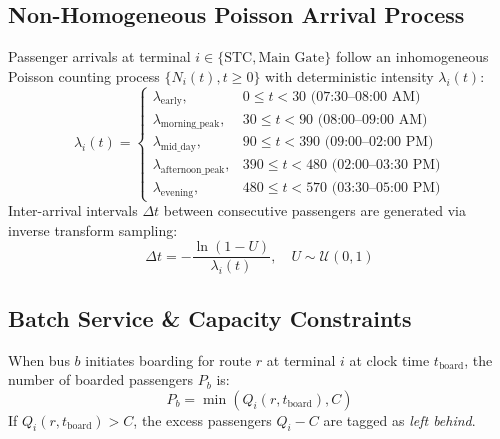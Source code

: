\documentclass[conference]{IEEEtran}
\begin{document}
\subsection{Non-Homogeneous Poisson Arrival Process}
Passenger arrivals at terminal $i \in \{\text{STC}, \text{Main Gate}\}$ follow an inhomogeneous Poisson counting process $\{N_i(t), t \ge 0\}$ with deterministic intensity $\lambda_i(t)$:
\begin{equation}
\lambda_i(t) = \begin{cases} 
\lambda_{\text{early}}, & 0 \le t < 30 \text{ (07:30--08:00 AM)} \\
\lambda_{\text{morning\_peak}}, & 30 \le t < 90 \text{ (08:00--09:00 AM)} \\
\lambda_{\text{mid\_day}}, & 90 \le t < 390 \text{ (09:00--02:00 PM)} \\
\lambda_{\text{afternoon\_peak}}, & 390 \le t < 480 \text{ (02:00--03:30 PM)} \\
\lambda_{\text{evening}}, & 480 \le t < 570 \text{ (03:30--05:00 PM)}
\end{cases}
\end{equation}
Inter-arrival intervals $\Delta t$ between consecutive passengers are generated via inverse transform sampling:
\begin{equation}
\Delta t = -\frac{\ln(1 - U)}{\lambda_i(t)}, \quad U \sim \mathcal{U}(0, 1)
\end{equation}

\subsection{Batch Service \& Capacity Constraints}
When bus $b$ initiates boarding for route $r$ at terminal $i$ at clock time $t_{\text{board}}$, the number of boarded passengers $P_b$ is:
\begin{equation}
P_b = \min\left(Q_i(r, t_{\text{board}}), C\right)
\end{equation}
If $Q_i(r, t_{\text{board}}) > C$, the excess passengers $Q_i - C$ are tagged as \textit{left behind}.
\end{document}
